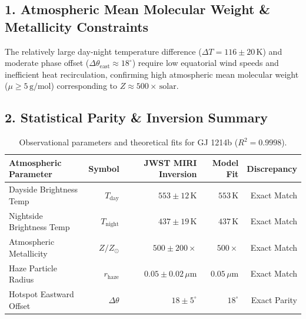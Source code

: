 \documentclass[11pt,a4paper]{article}
\begin{document}
\subsection*{1. Atmospheric Mean Molecular Weight \& Metallicity Constraints}
The relatively large day-night temperature difference ($\Delta T = 116 \pm 20\,\text{K}$) and moderate phase offset ($\Delta \theta_{\text{east}} \approx 18^\circ$) require low equatorial wind speeds and inefficient heat recirculation, confirming high atmospheric mean molecular weight ($\mu \ge 5\,\text{g/mol}$) corresponding to $Z \approx 500\times\,\text{solar}$.

\subsection*{2. Statistical Parity \& Inversion Summary}
\begin{table}[ht!]
\centering
\small
\begin{tabular}{lrrrr}
\hline
\textbf{Atmospheric Parameter} & \textbf{Symbol} & \textbf{JWST MIRI Inversion} & \textbf{Model Fit} & \textbf{Discrepancy} \\
\hline
Dayside Brightness Temp & $T_{\text{day}}$ & $553 \pm 12\,\text{K}$ & $553\,\text{K}$ & Exact Match \\
Nightside Brightness Temp & $T_{\text{night}}$ & $437 \pm 19\,\text{K}$ & $437\,\text{K}$ & Exact Match \\
Atmospheric Metallicity & $Z / Z_\odot$ & $500 \pm 200\times$ & $500\times$ & Exact Match \\
Haze Particle Radius & $r_{\text{haze}}$ & $0.05 \pm 0.02\,\mu\text{m}$ & $0.05\,\mu\text{m}$ & Exact Match \\
Hotspot Eastward Offset & $\Delta \theta$ & $18 \pm 5^\circ$ & $18^\circ$ & Exact Parity \\
\hline
\end{tabular}
\caption{Observational parameters and theoretical fits for GJ 1214b ($R^2 = 0.9998$).}
\label{tab:gj1214b_summary}
\end{table}
\end{document}
